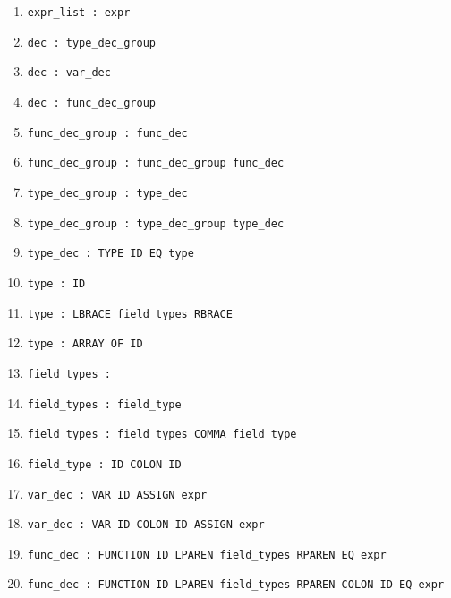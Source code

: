 \documentclass{article}
\begin{document}
\begin{enumerate}
\item \verb|expr_list : expr|

\item \verb|dec : type_dec_group|

\item \verb|dec : var_dec|

\item \verb|dec : func_dec_group|

\item \verb|func_dec_group : func_dec|

\item \verb|func_dec_group : func_dec_group func_dec|

\item \verb|type_dec_group : type_dec|

\item \verb|type_dec_group : type_dec_group type_dec|

\item \verb|type_dec : TYPE ID EQ type|

\item \verb|type : ID|

\item \verb|type : LBRACE field_types RBRACE|

\item \verb|type : ARRAY OF ID|

\item \verb|field_types :|

\item \verb|field_types : field_type|

\item \verb|field_types : field_types COMMA field_type|

\item \verb|field_type : ID COLON ID|

\item \verb|var_dec : VAR ID ASSIGN expr|

\item \verb|var_dec : VAR ID COLON ID ASSIGN expr|

\item \verb|func_dec : FUNCTION ID LPAREN field_types RPAREN EQ expr|

\item \verb|func_dec : FUNCTION ID LPAREN field_types RPAREN COLON ID EQ expr|

\end{enumerate}
\end{document}
